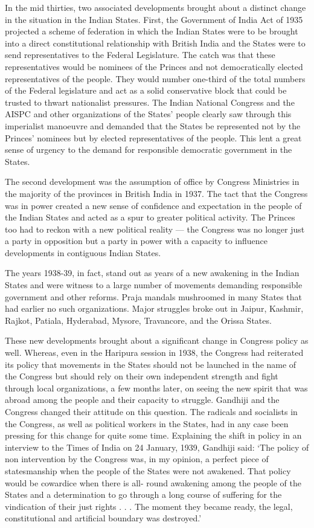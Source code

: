 In the mid thirties, two associated developments brought about a distinct change in the situation in the Indian States. First, the Government of India Act of 1935 projected a scheme of federation in which the Indian States were to be brought into a direct constitutional relationship with British India and the States were to send representatives to the Federal Legislature. The catch was that these representatives would be nominees of the Princes and not democratically elected representatives of the people. They would number one-third of the total numbers of the Federal legislature and act as a solid conservative block that could be trusted to thwart nationalist pressures. The Indian National Congress and the AISPC and other organizations of the States’ people clearly saw through this imperialist manoeuvre and demanded that the States be represented not by the Princes’ nominees but by elected representatives of the people. This lent a great sense of urgency to the demand for responsible democratic government in the States. 

The second development was the assumption of office by Congress Ministries in the majority of the provinces in British India in 1937. The tact that the Congress was in power created a new sense of confidence and expectation in the people of the Indian States and acted as a spur to greater political activity. The Princes too had to reckon with a new political reality — the Congress was no longer just a party in opposition but a party in power with a capacity to influence developments in contiguous Indian States. 

The years 1938-39, in fact, stand out as years of a new awakening in the Indian States and were witness to a large number of movements demanding responsible government and other reforms. Praja mandals mushroomed in many States that had earlier no such organizations. Major struggles broke out in Jaipur, Kashmir, Rajkot, Patiala, Hyderabad, Mysore, Travancore, and the Orissa States. 

These new developments brought about a significant change in Congress policy as well. Whereas, even in the Haripura session in 1938, the Congress had reiterated its policy that movements in the States should not be launched in the name of the Congress but should rely on their own independent strength and fight through local organizations, a few months later, on seeing the new spirit that was abroad among the people and their capacity to struggle. Gandhiji and the Congress changed their attitude on this question. The radicals and socialists in the Congress, as well as political workers in the States, had in any case been pressing for this change for quite some time. Explaining the shift in policy in an interview to the Times of India on 24 January, 1939, Gandhiji said: ‘The policy of non­ intervention by the Congress was, in my opinion, a perfect piece of statesmanship when the people of the States were not awakened. That policy would be cowardice when there is all- round awakening among the people of the States and a determination to go through a long course of suffering for the vindication of their just rights . . . The moment they became ready, the legal, constitutional and artificial boundary was destroyed.’ 

